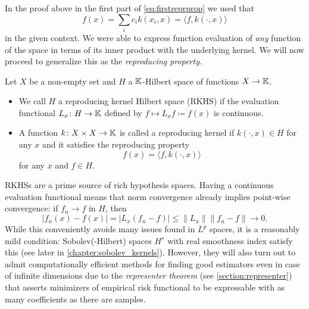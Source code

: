 In the proof above in the first part of \cref{eq:firstreprprop}
we used that 
\begin{equation*}
    f(x) = \sum_i c_i k(x_i,x) = \langle f, k(\cdot,x) \rangle
\end{equation*}
in the given context.
We were able to express function evaluation of \emph{any} 
function of the space in terms of its inner product with 
the underlying kernel.
We will now proceed to generalize this as the 
\emph{reproducing property}.

\begin{defn}
    Let $X$ be a non-empty set and $H$ a $\mathbb{K}$-Hilbert space
    of functions $X \to \mathbb{K}$.
    \begin{itemize}
        \item We call $H$ a reproducing kernel Hilbert space
            (RKHS) if the evaluation functional $L_x \colon H \to \mathbb{K}$ 
            defined by $f \mapsto L_xf \coloneqq f(x)$ is continuous.  
        \item A function $k \colon X \times X \to \mathbb{K}$ is called 
            a reproducing kernel if $k(\cdot,x) \in H$ for any 
            $x$ and it satisfies the reproducing property
            \begin{equation}\label{eq:reprprop}
                f(x) = \langle f,k(\cdot,x) \rangle
            \end{equation}
            for any $x$ and $f \in H$.
    \end{itemize}
\end{defn}

RKHSs are a prime source of rich hypothesis spaces.
Having a continuous evaluation functional means that norm 
convergence already implies point-wise convergence:
if $f_n \to f$ in $H$, then 
\begin{equation}\label{eq:normconv_pwconv}
    |f_n(x) - f(x)| = |L_x(f_n - f)| 
        \leq \|L_x\| \|f_n - f\| \to 0.
\end{equation}
While this conveniently avoids many issues found 
in $L^p$ spaces, it is a reasonably mild condition:
Sobolev(-Hilbert) spaces $H^s$ with real smoothness index
satisfy this (see later in \cref{chapter:sobolev_kernels}).
However, they will also turn out to admit computationally 
efficient methods for finding good estimators even in 
case of infinite dimensions due to the 
\emph{representer theorem} 
(see \cref{section:representer}) 
that asserts minimizers of empirical risk functional
to be expressable with as many coefficients as there are
samples.

